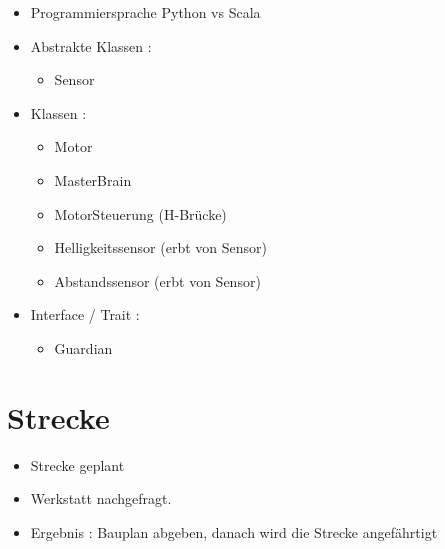 \documentclass{article}
\begin{document}
\begin{itemize}

\item Programmiersprache Python vs Scala

\item Abstrakte Klassen :
\begin{itemize}

\item Sensor

\end{itemize}

\item Klassen : 

\begin{itemize}

\item Motor

\item MasterBrain

\item MotorSteuerung (H-Br\"{u}cke)

\item Helligkeitssensor (erbt von Sensor)

\item Abstandssensor (erbt von Sensor)

\end{itemize}

\item Interface / Trait : 
\begin{itemize}

\item Guardian

\end{itemize}

\end{itemize}

\section{Strecke}

\begin{itemize}

\item Strecke geplant

\item Werkstatt nachgefragt.

\item Ergebnis : Bauplan abgeben, danach wird die Strecke angef\"{a}hrtigt

\end{itemize}
\end{document}

